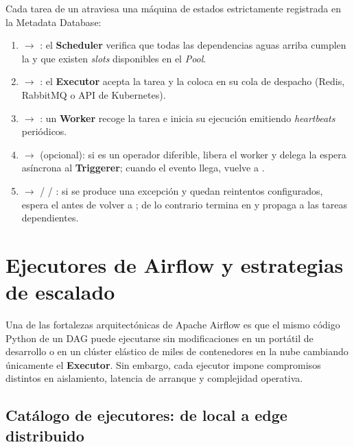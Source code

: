 \begin{infobox}
Cada tarea de un  atraviesa una máquina de estados estrictamente registrada en la Metadata Database:
\begin{enumerate}
  \item {} $\to$ : el \textbf{Scheduler} verifica que todas las dependencias aguas arriba cumplen la  y que existen \textit{slots} disponibles en el \textit{Pool}.
  \item {} $\to$ : el \textbf{Executor} acepta la tarea y la coloca en su cola de despacho (Redis, RabbitMQ o API de Kubernetes).
  \item {} $\to$ : un \textbf{Worker} recoge la tarea e inicia su ejecución emitiendo \textit{heartbeats} periódicos.
  \item {} $\to$  (opcional): si es un operador diferible, libera el worker y delega la espera asíncrona al \textbf{Triggerer}; cuando el evento llega, vuelve a .
  \item {} $\to$  /  / : si se produce una excepción y quedan reintentos configurados, espera el  antes de volver a ; de lo contrario termina en  y propaga  a las tareas dependientes.
\end{enumerate}
\end{infobox}

\section{Ejecutores de Airflow y estrategias de escalado}\label{sec:ejecutores}

Una de las fortalezas arquitectónicas de Apache Airflow es que el mismo código Python de un DAG puede ejecutarse sin modificaciones en un portátil de desarrollo o en un clúster elástico de miles de contenedores en la nube cambiando únicamente el \textbf{Executor}. Sin embargo, cada ejecutor impone compromisos distintos en aislamiento, latencia de arranque y complejidad operativa.

\subsection{Catálogo de ejecutores: de local a edge distribuido}\label{subsec:catalogo-ejecutores}

